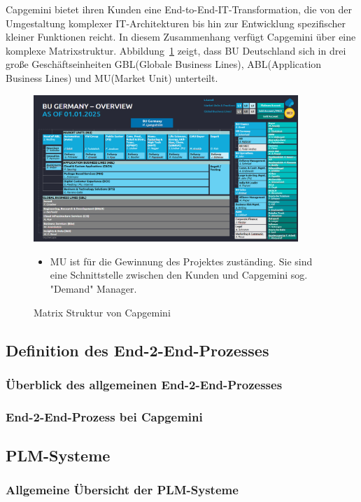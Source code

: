 \documentclass[a4paper, 12pt]{scrartcl}
\begin{document}
Capgemini bietet ihren Kunden eine End-to-End-IT-Transformation, die von der Umgestaltung komplexer IT-Architekturen bis hin zur Entwicklung spezifischer kleiner Funktionen reicht. In diesem Zusammenhang verfügt Capgemini über eine komplexe Matrixstruktur. Abbildung~\ref{fig:Matrix Struktur} zeigt, dass BU Deutschland sich in drei große Geschäftseinheiten GBL(Globale Business Lines), ABL(Application Business Lines) und MU(Market Unit) unterteilt.
	\begin{figure}[h!]
	\begin{center}
		\includegraphics[width=10cm]{BU Germany CAP.png}
		\caption{Matrix Struktur von Capgemini}
		\label{fig:Matrix Struktur}
	\end{center}
	\begin{itemize}
		\item MU ist für die Gewinnung des Projektes zuständing. Sie sind eine Schnittstelle zwischen den Kunden und Capgemini sog. "Demand" Manager. 
	\end{itemize}
\end{figure}
	\newpage
	\subsection{Definition des End-2-End-Prozesses}
	\subsubsection{Überblick des allgemeinen End-2-End-Prozesses} %
	\subsubsection{End-2-End-Prozess bei Capgemini}
	\subsection{PLM-Systeme}
	\subsubsection{Allgemeine Übersicht der PLM-Systeme}
\end{document}
